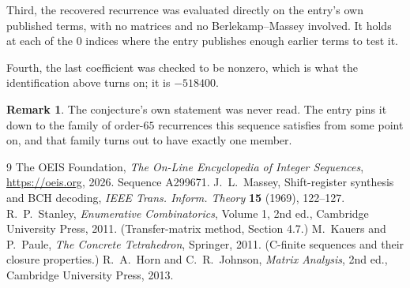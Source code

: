 \documentclass[11pt,a4paper]{article}
\theoremstyle{plain}
\theoremstyle{definition}
\newtheorem{remark}[theorem]{Remark}
\begin{document}
Third, the recovered recurrence was evaluated directly on the entry's own published terms, with
no matrices and no Berlekamp--Massey involved. It holds at each of the $0$ indices where
the entry publishes enough earlier terms to test it.

Fourth, the last coefficient was checked to be nonzero, which is what the identification above
turns on; it is $-518400$.

\begin{remark}
The conjecture's own statement was never read. The entry pins it down to the family of
order-$65$ recurrences this sequence satisfies from some point on, and that family turns
out to have exactly one member.
\end{remark}

\begin{thebibliography}{9}
 The OEIS Foundation, \emph{The On-Line Encyclopedia of Integer
Sequences}, \url{https://oeis.org}, 2026. Sequence A299671.
 J.~L.~Massey, Shift-register synthesis and BCH decoding, \emph{IEEE
Trans. Inform. Theory} \textbf{15} (1969), 122--127.
 R.~P.~Stanley, \emph{Enumerative Combinatorics}, Volume 1, 2nd ed.,
Cambridge University Press, 2011. (Transfer-matrix method, Section 4.7.)
 M.~Kauers and P.~Paule, \emph{The Concrete Tetrahedron}, Springer, 2011.
(C-finite sequences and their closure properties.)
 R.~A.~Horn and C.~R.~Johnson, \emph{Matrix Analysis}, 2nd ed., Cambridge
University Press, 2013.
\end{thebibliography}
\end{document}
